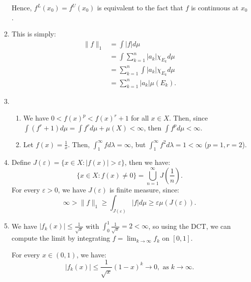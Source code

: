 \begin{enumerate}[label=\textbf{3B.\arabic*}]
  Hence, \( f^{L}(x_{0})=f^{U}(x_{0}) \) is equivalent to the fact that \( f \)
  is continuous at \( x_{0} \).
\item This is simply:
  \begin{align*}
    \|f\|_{1} &= \int |f|d\mu\\
            &= \int \sum_{k=1}^{n} |a_{k}|\chi_{E_{k}}d\mu  \\
            &= \sum_{k=1}^{n} \int |a_{k}|\chi_{E_{k}}d\mu \\
            &= \sum_{k=1}^{n} |a_{k}|\mu (E_{k})
  .\end{align*}
\item 
  \begin{enumerate}[label=(\alph*)]
    \item
    We have \( 0 < f(x)^{p} < f(x)^{r} + 1 \) for all \( x \in X \). Then, since \(
    \int (f^{r}+1)d\mu = \int f^{r}d\mu + \mu (X) < \infty\), then \( \int
    f^{p}d\mu  < \infty \).
    \item
    Let \( f(x) = \frac{1}{x} \). Then, \( \int_{1}^{\infty} fd\lambda = \infty
    \), but \( \int _{1}^{\infty} f^2d\lambda = 1 < \infty \) (\( p=1, r=2 \)).
  \end{enumerate}
\item Define \( J(\varepsilon) = \{x \in X: |f(x)| > \varepsilon\}   \), then we
  have:
  \[
    \{x \in X: f(x) \neq 0\} = \bigcup_{n = 1}^{\infty} J \left( \frac{1}{n} \right) 
  .\] 
  For every \( \varepsilon > 0 \), we have \( J(\varepsilon) \) is finite
  measure, since:
  \[
    \infty > \|f\|_{1} \ge \int _{J(\varepsilon)} |f|d\mu \ge \varepsilon \mu
    (J(\varepsilon))
  .\] 
\item We have \( |f_{k}(x)| \le \frac{1}{\sqrt{x} } \) with \( \int _{0}^{1}
  \frac{1}{\sqrt{x}} = 2 < \infty \), so using the DCT, we can compute the limit
  by integrating \( f = \lim_{k \to \infty} f_{k} \) on \( [0, 1] \).

  For every \( x \in (0, 1) \), we have:
  \[
    |f_{k}(x)| \le \frac{1}{\sqrt{x} }(1-x)^{k} \to 0, \text{ as } k \to \infty
  .\]


\end{enumerate}
